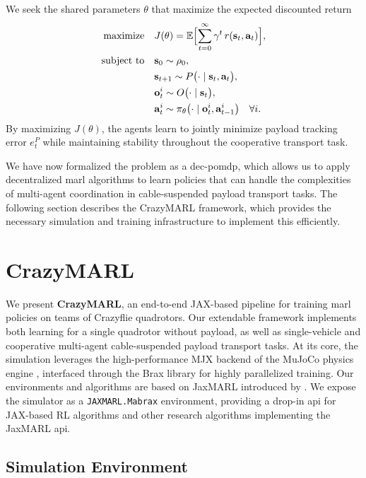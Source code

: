 We seek the shared parameters \(\theta\) that maximize the expected discounted return
\begin{equation}
\begin{aligned}
\text{maximize}\quad & J(\theta) = \mathbb{E}\Bigl[\sum_{t=0}^\infty \gamma^t\,r(\mathbf{s}_t,\mathbf{a}_t)\Bigr],\\
\text{subject to}\quad &\mathbf{s}_0 \sim \rho_0,\\
&\mathbf{s}_{t+1} \sim P\bigl(\cdot\mid \mathbf{s}_t,\mathbf{a}_t\bigr),\\
&\mathbf{o}^i_t \sim O\bigl(\cdot\mid \mathbf{s}_t\bigr),\\
&\mathbf{a}^i_t \sim \pi_{\theta}\bigl(\cdot\mid \mathbf{o}^i_t,\mathbf{a}^i_{t-1}\bigr)
\quad\forall i.
\end{aligned}
\end{equation}
By maximizing \(J(\theta)\), the agents learn to jointly minimize payload tracking error \(e^P_t\) while maintaining stability throughout the cooperative transport task.

We have now formalized the problem as a \gls{dec-pomdp}, which allows us to apply decentralized \gls{marl} algorithms to learn policies that can handle the complexities of multi-agent coordination in cable-suspended payload transport tasks. The following section describes the CrazyMARL framework, which provides the necessary simulation and training infrastructure to implement this efficiently.

\section{CrazyMARL}
We present \textbf{CrazyMARL}, an end-to-end JAX-based pipeline for training \gls{marl} policies on teams of Crazyflie quadrotors. Our extendable framework implements both learning for a single quadrotor without payload, as well as single-vehicle and cooperative multi-agent cable-suspended payload transport tasks. At its core, the simulation leverages the high-performance MJX backend of the MuJoCo physics engine \cite{todorov2012mujoco}, interfaced through the Brax library for highly parallelized training. Our environments and algorithms are based on JaxMARL introduced by \autocite{flair2023jaxmarl}. We expose the simulator as a \texttt{JAXMARL.Mabrax} environment, providing a drop-in \gls{api} for JAX-based RL algorithms and other research algorithms implementing the JaxMARL \gls{api}.

\subsection{Simulation Environment}

